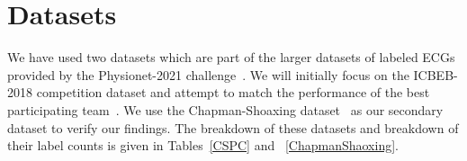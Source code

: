 \documentclass{article}
\begin{document}
\section{Datasets}
We have used two datasets which are part of the larger datasets of labeled ECGs provided by the Physionet-2021 challenge~\cite{reyna2021will,reyna4issues}. We will initially focus on the ICBEB-2018 competition dataset and attempt to match the performance of the best participating team~\cite{liu2018open}. We use the Chapman-Shoaxing dataset~\cite{zheng202012} as our secondary dataset to verify our findings. The breakdown of these datasets and breakdown of their label counts is given in Tables~\ref{CSPC} and ~\ref{ChapmanShaoxing}.



\printbibliography
\end{document}
